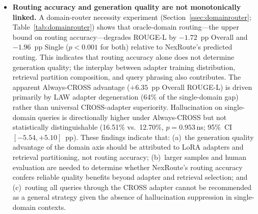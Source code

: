 \documentclass[a4paper,fleql]{cas-sc}
\begin{document}
\begin{itemize}
interdisciplinary queries. The sensitivity analysis (Supplementary Material~S3)
indicates that the architecture operates within a stable plateau ($< 0.7$~pp
variation) on the current evaluation set, though deployment in strongly
out-of-distribution environments may warrant further calibration. Two concrete directions address this. First, an evidence-aware router would
condition its domain and function decision not only on the query but also on
the distribution of retrieved candidate passages, performing a lightweight
evidence-alignment check before committing to a final routing decision.
Second, hard thresholds could be replaced with calibrated confidence
estimation---for example, temperature scaling validated via reliability
diagrams---so the system reports routing uncertainty rather than a binary
$(\tau, \delta)$ decision.
The current framework applies a single global $(\tau, \delta)$ pair across all
domains; domain-conditional thresholds could potentially recover STEM
routing accuracy without sacrificing CROSS recall, and are left to
future work.
A deeper limitation is that the current formulation (Eq.~\ref{eq:nexus_joint}) treats CROSS detection
as a post-hoc threshold rule rather than as part of a unified probabilistic model over
$\mathcal{D} \cup \{\texttt{CROSS}\}$; replacing this with a learned posterior
that assigns calibrated probability mass to the CROSS class directly
is an important direction for future work.
\item \textbf{Routing accuracy and generation quality are not monotonically linked.}
A domain-router necessity experiment (Section~\ref{ssec:domainrouter};
Table~\ref{tab:domainrouter}) shows that oracle-domain routing---the upper bound on
routing accuracy---degrades ROUGE-L by $-1.72$~pp Overall and $-1.96$~pp Single
($p{<}0.001$ for both) relative to NexRoute's predicted routing.
This indicates that routing accuracy alone does not determine generation quality;
the interplay between adapter training distribution, retrieval partition composition,
and query phrasing also contributes.
The apparent Always-CROSS advantage ($+6.35$~pp Overall ROUGE-L) is driven primarily
by LAW adapter degeneration (64\% of the single-domain gap) rather than universal
CROSS-adapter superiority.
Hallucination on single-domain queries is directionally higher under Always-CROSS
but not statistically distinguishable (16.51\% vs.\ 12.70\%, $p{=}0.953$\,\textsf{ns};
95\%~CI $[-5.54,{+}5.10]$~pp).
These findings indicate that: (a)~the generation quality advantage of the domain
axis should be attributed to LoRA adapters and retrieval partitioning, not routing
accuracy; (b)~larger samples and human evaluation are needed to determine whether
NexRoute's routing accuracy confers reliable quality benefits beyond adapter and
retrieval selection; and (c)~routing all queries through the CROSS adapter cannot
be recommended as a general strategy given the absence of hallucination suppression
in single-domain contexts.


\end{itemize}
\end{document}
